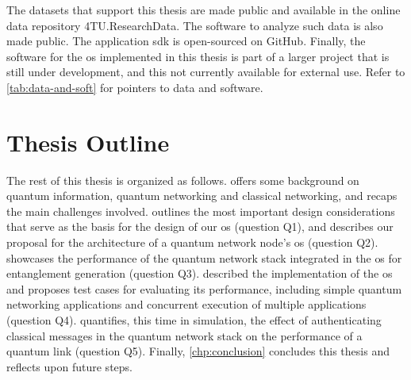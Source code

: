 The datasets that support this thesis are made public and available in the online data repository
4TU.ResearchData. The software to analyze such data is also made public. The application
\acrfull{sdk} is open-sourced on GitHub. Finally, the software for the \acrlong{os} implemented in
this thesis is part of a larger project that is still under development, and this not currently
available for external use. Refer to \cref{tab:data-and-soft} for pointers to data and software.

\section{Thesis Outline}

The rest of this thesis is organized as follows.  offers some background on
quantum information, quantum networking and classical networking, and recaps the main challenges
involved.  outlines the most important design considerations that serve as the basis
for the design of our \acrshort{os} (question Q1), and describes our proposal for the architecture
of a quantum network node's \acrshort{os} (question Q2).  showcases the
performance of the quantum network stack integrated in the \acrshort{os} for entanglement generation
(question Q3).  described the implementation of the \acrshort{os} and proposes
test cases for evaluating its performance, including simple quantum networking applications and
concurrent execution of multiple applications (question Q4).  quantifies, this time in
simulation, the effect of authenticating classical messages in the quantum network stack on the
performance of a quantum link (question Q5). Finally, \cref{chp:conclusion} concludes this thesis
and reflects upon future steps.

\begin{xstretch}
\printbibliography[heading=subbibintoc,title={References},notcategory=noprint]
\end{xstretch}

